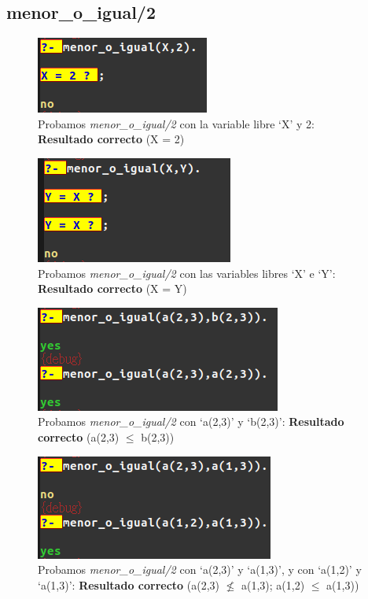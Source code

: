 \documentclass[12pt, a4paper, spanish]{article}
\begin{document}
\subsection{menor\_o\_igual/2}
\begin{multicols}{2}
	\begin{figure}[H]
		\centering
		\includegraphics{images/menorIgual1.png}
		\caption{Probamos \textit{menor\_o\_igual/2} con la variable libre `X' y 2: \textbf{Resultado correcto} (X = 2)}
	\end{figure}
	\begin{figure}[H]
		\includegraphics[scale=0.75]{images/menorIgual2.png}
		\caption{Probamos \textit{menor\_o\_igual/2} con las variables libres `X' e `Y': \textbf{Resultado correcto} (X = Y)}
	\end{figure}
\end{multicols}

\begin{multicols}{2}
\begin{figure}[H]
	\centering
	\includegraphics[scale=0.75]{images/menorIgual3.png}
	\caption{Probamos \textit{menor\_o\_igual/2} con `a(2,3)' y `b(2,3)': \textbf{Resultado correcto} (a(2,3) $\leq$ b(2,3))}
\end{figure}
\begin{figure}[H]
	\centering
	\includegraphics[scale=0.75]{images/menorIgual4.png}
	\caption{Probamos \textit{menor\_o\_igual/2} con `a(2,3)' y `a(1,3)', y con `a(1,2)' y `a(1,3)': \textbf{Resultado correcto} (a(2,3) $\nleq$ a(1,3); a(1,2) $\leq$ a(1,3))}
\end{figure}
\end{multicols}
\end{document}
